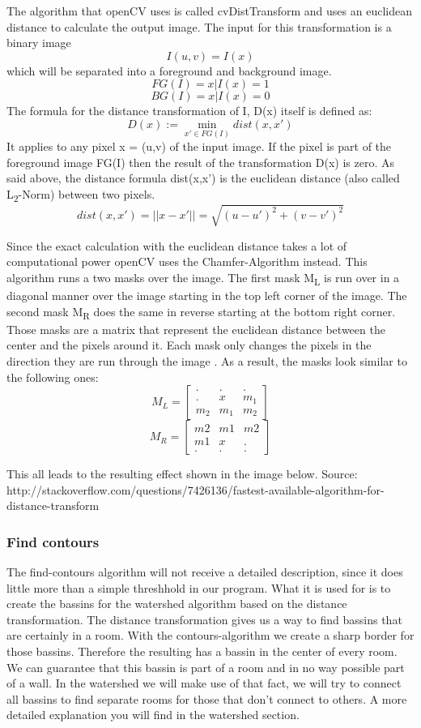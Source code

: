 The algorithm that openCV uses is called cvDistTransform and uses an euclidean distance to calculate the output image. The input for this transformation is a binary image \[I(u,v) = I(x)\] which will be separated into a foreground and background image.
\[FG(I) = {x | I(x) = 1}\]
\[BG(I) = {x | I(x) = 0}\]
The formula for the distance transformation of I, D(x) itself is defined as:
\[D(x) :=\min_{x' \in FG(I)} dist(x,x') \]
It applies to any pixel x = (u,v) of the input image. If the pixel is part of the foreground image FG(I) then the result of the transformation D(x) is zero. As said above, the distance formula dist(x,x') is the euclidean distance (also called L\textsubscript{2}-Norm) between two pixels.
\[dist(x,x') = ||x - x'|| = \sqrt{(u - u')^2 + (v - v')^2}\]

Since the exact calculation with the euclidean distance takes a lot of computational power openCV uses the Chamfer-Algorithm instead. This algorithm runs a two masks over the image. The first mask M\textsubscript{L} is run over in a diagonal manner over the image starting in the top left corner of the image. The second mask M\textsubscript{R} does the same in reverse starting at the bottom right corner. Those masks are a matrix that represent the euclidean distance between the center and the pixels around it. Each mask only changes the pixels in the direction they are run through the image \cite{burger_burge_2016}. As a result, the masks look similar to the following ones:
\[M_{L} = \begin{bmatrix} . & . & .\\ . & x & m_1 \\ m_2 & m_1 & m_2 \end{bmatrix}\]
\[M_{R} = \begin{bmatrix} m2 & m1 & m2 \\ m1 & x & . \\ . & . & . \end{bmatrix}\]

This all leads to the resulting effect shown in the image below.
Source: http://stackoverflow.com/questions/7426136/fastest-available-algorithm-for-distance-transform

\subsubsection{Find contours}
The find-contours algorithm will not receive a detailed description, since it does little more than a simple threshhold in our program. What it is used for is to create the bassins for the watershed algorithm based on the distance transformation. The distance transformation gives us a way to find bassins that are certainly in a room. With the contours-algorithm we create a sharp border for those bassins. Therefore the resulting has a bassin in the center of every room. We can guarantee that this bassin is part of a room and in no way possible part of a wall. In the watershed we will make use of that fact, we will try to connect all bassins to find separate rooms for those that don't connect to others. A more detailed explanation you will find in the watershed section.

